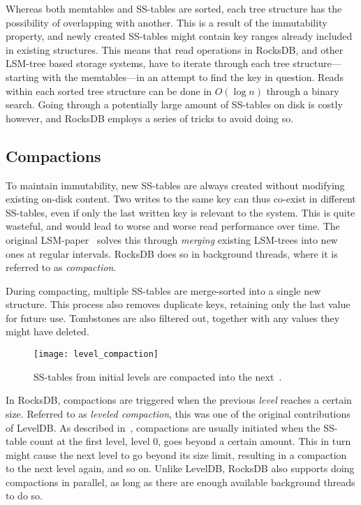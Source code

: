Whereas both memtables and SS-tables are sorted, each tree structure has the
possibility of overlapping with another. This is a result of the immutability
property, and newly created SS-tables might contain key ranges already included
in existing structures. This means that read operations in RocksDB, and other
LSM-tree based storage systems, have to iterate through each tree
structure---starting with the memtables---in an attempt to find the key in
question. Reads within each sorted tree structure can be done in $ O(\log n) $
through a binary search. Going through a potentially large amount of SS-tables
on disk is costly however, and RocksDB employs a series of tricks to avoid doing
so.

\subsection{Compactions}\label{sec:compactions}

To maintain immutability, new SS-tables are always created without modifying
existing on-disk content. Two writes to the same key can thus co-exist in
different SS-tables, even if only the last written key is relevant to the
system. This is quite wasteful, and would lead to worse and worse read
performance over time. The original LSM-paper~\cite{lsm} solves this through
\textit{merging} existing LSM-trees into new ones at regular intervals. RocksDB
does so in background threads, where it is referred to as \textit{compaction}.

During compacting, multiple SS-tables are merge-sorted into a single new
structure. This process also removes duplicate keys, retaining only the last
value for future use. Tombstones are also filtered out, together with any values
they might have deleted.

\begin{figure}[H]
  \centering
  \texttt{[image: level\_compaction]}
  \caption{SS-tables from initial levels are compacted into the next~\cite{rocksdb-compaction}.}
\end{figure}

In RocksDB, compactions are triggered when the previous \textit{level} reaches a
certain size. Referred to as \textit{leveled compaction}, this was one of the
original contributions of LevelDB\@. As described in~\cite{rocksdb-compaction},
compactions are usually initiated when the SS-table count at the first level,
level 0, goes beyond a certain amount. This in turn might cause the next level
to go beyond its size limit, resulting in a compaction to the next level again,
and so on. Unlike LevelDB, RocksDB also supports doing compactions in parallel,
as long as there are enough available background threads to do so.

